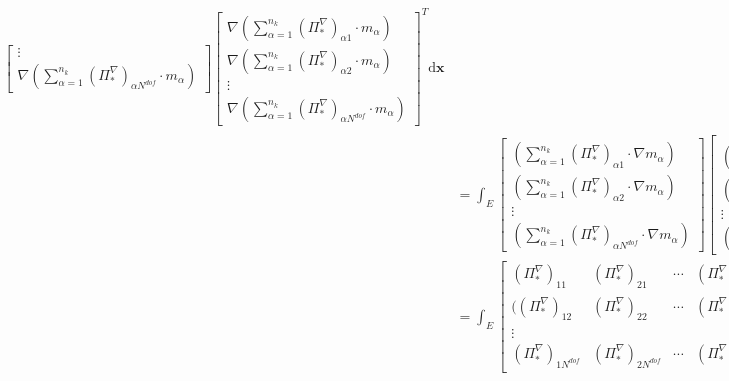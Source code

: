 \begin{equation}
\begin{aligned}
\begin{bmatrix}
\vdots\\
\nabla(\sum_{\alpha = 1}^{n_k}(\Pi_{*}^{\nabla})_{\alpha N^{dof}}\cdot m_{\alpha})
\end{bmatrix}\begin{bmatrix} 
\nabla(\sum_{\alpha = 1}^{n_k}(\Pi_{*}^{\nabla})_{\alpha 1}\cdot m_{\alpha})\\ 
\nabla(\sum_{\alpha = 1}^{n_k}(\Pi_{*}^{\nabla})_{\alpha 2}\cdot m_{\alpha}) \\ 
\vdots\\
\nabla(\sum_{\alpha = 1}^{n_k}(\Pi_{*}^{\nabla})_{\alpha N^{dof}}\cdot m_{\alpha})
\end{bmatrix}^T\mathrm d \mathbf x\\
& = \int_E \begin{bmatrix} 
(\sum_{\alpha = 1}^{n_k}(\Pi_{*}^{\nabla})_{\alpha 1}\cdot \nabla m_{\alpha})\\ 
(\sum_{\alpha = 1}^{n_k}(\Pi_{*}^{\nabla})_{\alpha 2}\cdot \nabla m_{\alpha}) \\ 
\vdots\\
(\sum_{\alpha = 1}^{n_k}(\Pi_{*}^{\nabla})_{\alpha N^{dof}}\cdot \nabla m_{\alpha})
\end{bmatrix}\begin{bmatrix} \\
(\sum_{\alpha = 1}^{n_k}(\Pi_{*}^{\nabla})_{\alpha 1}\cdot \nabla m_{\alpha})\\ 
(\sum_{\alpha = 1}^{n_k}(\Pi_{*}^{\nabla})_{\alpha 2}\cdot \nabla m_{\alpha}) \\ 
\vdots\\
(\sum_{\alpha = 1}^{n_k}(\Pi_{*}^{\nabla})_{\alpha N^{dof}}\cdot \nabla m_{\alpha})
\end{bmatrix}^T \mathrm d \mathbf x \\
& = \int_{E} \begin{bmatrix} 
(\Pi_{*}^{\nabla})_{1 1} & (\Pi_{*}^{\nabla})_{2 1} & \cdots  & (\Pi_{*}^{\nabla})_{n_k 1} \\ 
((\Pi_{*}^{\nabla})_{1 2} & (\Pi_{*}^{\nabla})_{2 2} & \cdots  & (\Pi_{*}^{\nabla})_{n_k 2} \\ 
\vdots\\
(\Pi_{*}^{\nabla})_{1 N^{dof}} & (\Pi_{*}^{\nabla})_{2 N^{dof}} & \cdots  & (\Pi_{*}^{\nabla})_{n_k N^{dof}}
\end{bmatrix}
\begin{bmatrix} 
\nabla m_{1}\\ 
\nabla m_{2} \\ 
\vdots\\
\nabla m_{n_k}

\end{bmatrix}
\end{aligned}
\end{equation}
